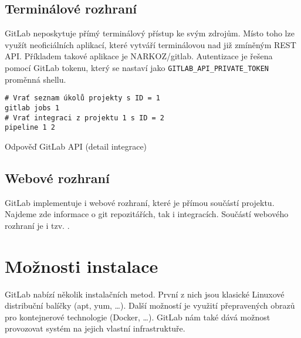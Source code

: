 \subsection{Terminálové rozhraní}

GitLab neposkytuje přímý terminálový přístup ke svým zdrojům.
Místo toho lze využít neoficiálních aplikací, které vytváří terminálovou  nad již zmíněným REST API.
Příkladem takové aplikace je NARKOZ/gitlab.
Autentizace je řešena pomocí GitLab tokenu, který se nastaví jako \verb|GITLAB_API_PRIVATE_TOKEN| proměnná shellu.

\begin{listing}[ht]
\begin{verbatim}
# Vrať seznam úkolů projekty s ID = 1
gitlab jobs 1
# Vrať integraci z projektu 1 s ID = 2
pipeline 1 2
\end{verbatim}
\label{code:gitlab-api}
\caption{Odpověď GitLab API (detail integrace)}
\end{listing}

\subsection{Webové rozhraní}

GitLab implementuje i webové rozhraní, které je přímou součástí projektu.
Najdeme zde informace o git repozitářích, tak i integracích.
Součástí webového rozhraní je i tzv. .


\section{Možnosti instalace}

GitLab nabízí několik instalačních metod.
První z nich jsou klasické Linuxové distribuční balíčky (apt, yum, \ldots).
Další možností je využití přepravených obrazů pro kontejnerové technologie (Docker, \ldots).
GitLab nám také dává možnost provozovat systém na jejich vlastní infrastruktuře.

